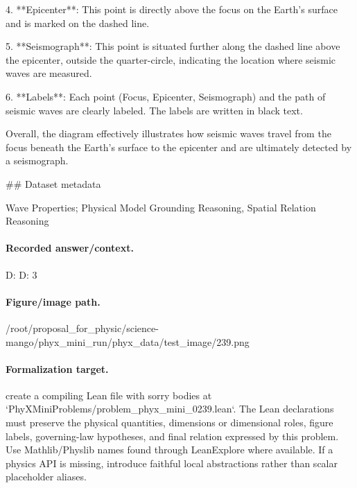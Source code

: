 4. **Epicenter**: This point is directly above the focus on the Earth's surface and is marked on the dashed line.

5. **Seismograph**: This point is situated further along the dashed line above the epicenter, outside the quarter-circle, indicating the location where seismic waves are measured.

6. **Labels**: Each point (Focus, Epicenter, Seismograph) and the path of seismic waves are clearly labeled. The labels are written in black text.

Overall, the diagram effectively illustrates how seismic waves travel from the focus beneath the Earth's surface to the epicenter and are ultimately detected by a seismograph.

\#\# Dataset metadata

Wave Properties; Physical Model Grounding Reasoning, Spatial Relation Reasoning

\paragraph{Recorded answer/context.}
D: D: 3

\paragraph{Figure/image path.}
/root/proposal\_for\_physic/science-mango/phyx\_mini\_run/phyx\_data/test\_image/239.png

\paragraph{Formalization target.}
create a compiling Lean file with sorry bodies at `PhyXMiniProblems/problem\_phyx\_mini\_0239.lean`. The Lean declarations must preserve the physical quantities, dimensions or dimensional roles, figure labels, governing-law hypotheses, and final relation expressed by this problem.
Use Mathlib/Physlib names found through LeanExplore where available. If a physics API is missing, introduce faithful local abstractions rather than scalar placeholder aliases.

